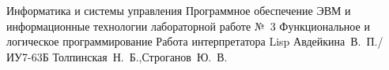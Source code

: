 \documentclass{bmstu}
\begin{document}
	\makereporttitle
	{Информатика и системы управления} %
	{Программное обеспечение ЭВМ и информационные технологии} %
	{лабораторной работе №~3} %
	{Функциональное и логическое программирование} %
	{Работа интерпретатора Lisp} %
	{} %
	{Авдейкина~В.~П./ИУ7-63Б} %
	{Толпинская~Н.~Б.,Строганов~Ю.~В.} %
\end{document}
